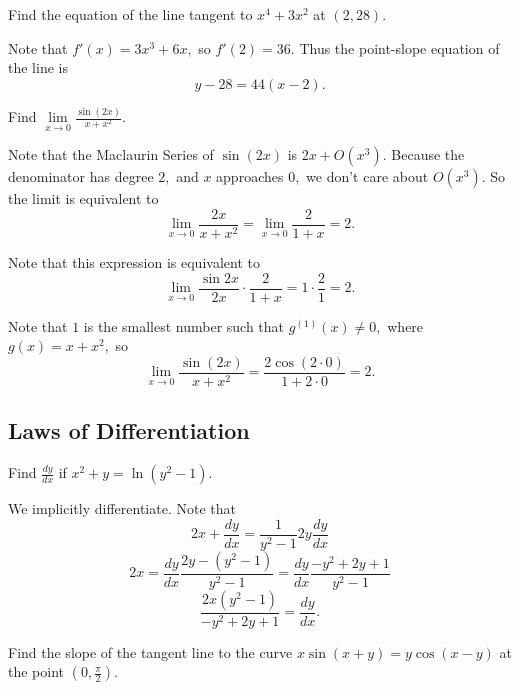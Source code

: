 \documentclass[blue,onecol]{shooting}
\begin{document}
\begin{exer}
Find the equation of the line tangent to $x^4+3x^2$ at $(2,28).$
\end{exer}

\begin{sol}
Note that $f'(x)=3x^3+6x,$ so $f'(2)=36.$ Thus the point-slope equation of the line is
\[y-28=44(x-2).\]
\end{sol}

\begin{exam}
Find $\lim\limits_{x\to 0}\frac{\sin (2x)}{x+x^2}.$
\end{exam}

\begin{sol}
Note that the Maclaurin Series of $\sin(2x)$ is $2x+O(x^3).$ Because the denominator has degree $2,$ and $x$ approaches $0,$ we don't care about $O(x^3).$ So the limit is equivalent to
\[\lim\limits_{x\to 0}\frac{2x}{x+x^2}=\lim\limits_{x\to 0}\frac{2}{1+x}=2.\]
\end{sol}

\begin{sol}[2 (Factoring)]
Note that this expression is equivalent to
\[\lim_{x\to 0}\frac{\sin 2x}{2x}\cdot\frac{2}{1+x}=1\cdot \frac{2}{1}=2.\]
\end{sol}

\begin{sol}[3 (L'Hopital's)]
Note that $1$ is the smallest number such that $g^{(1)}(x)\neq 0,$ where $g(x)=x+x^2,$ so
\[\lim_{x\to 0}\frac{\sin (2x)}{x+x^2}=\frac{2\cos(2\cdot 0)}{1+2\cdot 0}=2.\]
\end{sol}

\subsection{Laws of Differentiation}

\begin{exer}
Find $\frac{dy}{dx}$ if $x^2+y=\ln(y^2-1).$
\end{exer}

\begin{sol}
We implicitly differentiate. Note that
\[2x+\frac{dy}{dx}=\frac{1}{y^2-1}2y\frac{dy}{dx}\]
\[2x=\frac{dy}{dx}\frac{2y-(y^2-1)}{y^2-1}=\frac{dy}{dx}\frac{-y^2+2y+1}{y^2-1}\]
\[\frac{2x(y^2-1)}{-y^2+2y+1}=\frac{dy}{dx}.\]
\end{sol}

\begin{exer}
Find the slope of the tangent line to the curve $x\sin (x+y)=y\cos (x-y)$ at the point $(0,\frac{\pi}{2}).$
\end{exer}
\end{document}
